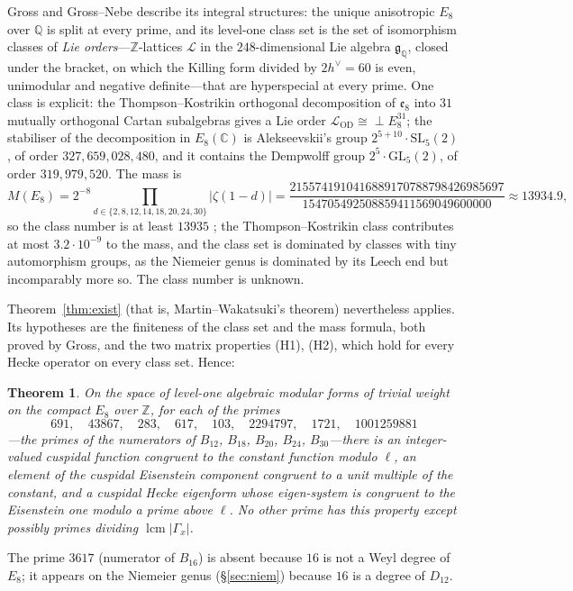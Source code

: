 \documentclass[11pt]{amsart}
\newtheorem{theorem}{Theorem}[section]
\theoremstyle{definition}
\newcommand{\Z}{\mathbb{Z}}\newcommand{\Q}{\mathbb{Q}}\newcommand{\R}{\mathbb{R}}\newcommand{\A}{\mathbb{A}}\newcommand{\F}{\mathbb{F}}
\begin{document}
Gross \cite{Gross-Z} and Gross--Nebe \cite{GN} describe its integral structures: the unique anisotropic $E_8$ over $\Q$ is split at every prime, and its level-one class set is the set of isomorphism classes of \emph{Lie orders}---$\Z$-lattices $\mathcal L$ in the $248$-dimensional Lie algebra $\mathfrak g_\Q$, closed under the bracket, on which the Killing form divided by $2h^\vee=60$ is even, unimodular and negative definite---that are hyperspecial at every prime. One class is explicit: the Thompson--Kostrikin orthogonal decomposition of $\mathfrak e_8$ into $31$ mutually orthogonal Cartan subalgebras gives a Lie order $\mathcal L_{\mathrm{OD}}\cong\perp E_8^{31}$; the stabiliser of the decomposition in $E_8(\mathbb C)$ is Alekseevskii's group $2^{5+10}\cdot\mathrm{SL}_5(2)$, of order $327{,}659{,}028{,}480$, and it contains the Dempwolff group $2^5\cdot\mathrm{GL}_5(2)$, of order $319{,}979{,}520$. The mass is
\[M(E_8)=2^{-8}\prod_{d\in\{2,8,12,14,18,20,24,30\}}|\zeta(1-d)|=\frac{2155741910416889170788798426985697}{154705492508859411569049600000}\approx13934.9,\]
so the class number is at least $13935$ \cite[Prop.~5.3]{Gross-Z}; the Thompson--Kostrikin class contributes at most $3.2\cdot10^{-9}$ to the mass, and the class set is dominated by classes with tiny automorphism groups, as the Niemeier genus is dominated by its Leech end but incomparably more so. The class number is unknown.

Theorem~\ref{thm:exist} (that is, Martin--Wakatsuki's theorem) nevertheless applies. Its hypotheses are the finiteness of the class set and the mass formula, both proved by Gross, and the two matrix properties (H1), (H2), which hold for every Hecke operator on every class set. Hence:
\begin{theorem}\label{thm:e8}
On the space of level-one algebraic modular forms of trivial weight on the compact $E_8$ over $\Z$, for each of the primes
\[691,\quad 43867,\quad 283,\quad 617,\quad 103,\quad 2294797,\quad 1721,\quad 1001259881\]
---the primes of the numerators of $B_{12}$, $B_{18}$, $B_{20}$, $B_{24}$, $B_{30}$---there is an integer-valued cuspidal function congruent to the constant function modulo $\ell$, an element of the cuspidal Eisenstein component congruent to a unit multiple of the constant, and a cuspidal Hecke eigenform whose eigen-system is congruent to the Eisenstein one modulo a prime above $\ell$. No other prime has this property except possibly primes dividing $\operatorname{lcm}|\Gamma_x|$.
\end{theorem}
The prime $3617$ (numerator of $B_{16}$) is absent because $16$ is not a Weyl degree of $E_8$; it appears on the Niemeier genus (\S\ref{sec:niem}) because $16$ is a degree of $D_{12}$.
\end{document}
